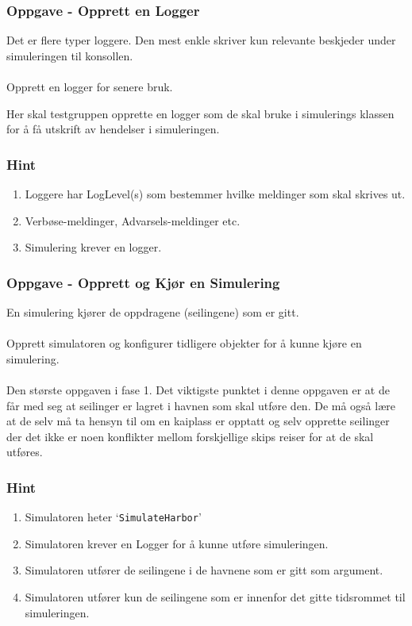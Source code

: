 \documentclass[12pt]{article}
\begin{document}
\subsubsection{Oppgave - Opprett en Logger}

Det er flere typer loggere. Den mest enkle skriver kun relevante beskjeder under simuleringen til konsollen. \\ \\
Opprett en logger for senere bruk.

Her skal testgruppen opprette en logger som de skal bruke i simulerings klassen for å få utskrift av hendelser i simuleringen.

\subsubsection*{Hint}

\begin{enumerate}
    \item Loggere har LogLevel(s) som bestemmer hvilke meldinger som skal skrives ut.
    \item Verbøse-meldinger, Advarsels-meldinger etc.
    \item Simulering krever en logger.
\end{enumerate}

\subsubsection{Oppgave - Opprett og Kjør en Simulering}

En simulering kjører de oppdragene (seilingene) som er gitt. \\ \\
Opprett simulatoren og konfigurer tidligere objekter for å kunne kjøre en simulering. \\ \\
Den største oppgaven i fase 1. Det viktigste punktet i denne oppgaven er at de får med seg at seilinger er lagret i havnen som skal utføre den.
De må også lære at de selv må ta hensyn til om en kaiplass er opptatt og selv opprette seilinger der det ikke er noen konflikter
mellom forskjellige skips reiser for at de skal utføres.

\subsubsection*{Hint}

\begin{enumerate}
    \item Simulatoren heter `\texttt{SimulateHarbor}'
    \item Simulatoren krever en Logger for å kunne utføre simuleringen.
    \item Simulatoren utfører de seilingene i de havnene som er gitt som argument.
    \item Simulatoren utfører kun de seilingene som er innenfor det gitte tidsrommet til simuleringen.
\end{enumerate}
\end{document}
